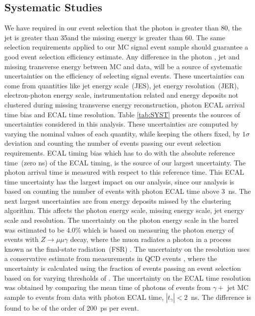 \subsection{Systematic Studies}
We have required in our event selection that the photon \pt is greater than 80\GeVc, the jet \pt is greater than 35\GeVc and the missing energy is greater than 60\GeV. The same selection requirements applied to our MC signal event sample should guarantee a good event selection efficiency estimate. Any difference in the photon \pt, jet \pt and missing transverse energy between MC and data, will be a source of systematic uncertainties on the efficiency of selecting signal events. These uncertainties can come from quantities like jet energy scale~(JES), jet energy resolution~(JER), electron-photon energy scale, instrumentation related and energy deposits not clustered during missing transverse energy reconstruction, photon ECAL arrival time bias and ECAL time resolution. 
\newline
Table \ref{tab:SYST} presents the sources of uncertainties considered in this analysis. These uncertainties are computed by varying the nominal values of each quantity, while keeping the others fixed, by $1\sigma$ deviation and counting the number of events passing our event selection requirements. ECAL timing bias which has to do with the absolute reference time~(zero ns) of the ECAL timing, is the source of our largest uncertainty. The photon arrival time is measured with respect to this reference time. This ECAL time uncertainty has the largest impact on our analysis, since our analysis is based on counting the number of events with photon ECAL time above $3$~ns. The next largest uncertainties are from energy deposits missed by the clustering algorithm. This affects the photon energy scale, missing energy scale,  jet energy scale and resolution.
The uncertainty on the photon energy scale in the barrel was estimated to be 4.0\%  which is based on measuring the photon energy of events with $Z\rightarrow \mu\mu\gamma$ decay, where the muon radiates a photon in a process known as the final-state radiation~(FSR) \cite{PES}.  
\newline
The uncertainty on the \MET resolution uses a conservative estimate from \MET measurements in QCD events \cite{METRES}, where the \MET uncertainty is calculated using the fraction of events passing an event selection based on \MET for varying thresholds of \MET. 
\newline
The uncertainty on the ECAL time resolution was obtained by comparing the mean time of photons of events from $\gamma +$ jet MC sample to events from data with photon ECAL time, $|t_{\gamma}| < 2$~ns. The difference is found to be of the order of 200~ps per event. 
